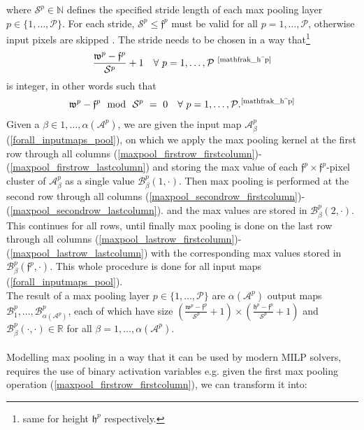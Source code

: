\documentclass{article}
\begin{document}
where $\mathcal{S}^p \in \mathbb{N}$ defines the specified stride length of each max pooling layer $p \in \{ 1, \ldots, \mathcal{P} \}$.  For each stride, $\mathcal{S}^p \leq \mathfrak{f}^p$ must be valid for all $p=1, \ldots, \mathcal{P}$, otherwise input pixels are skipped \cite{cs231:optimizers}. The stride needs to be chosen in a way that\footnote{same for height $\mathfrak{h}^p$ respectively.\label{mathfrak_h^p}}
\begin{align}
\frac{\mathfrak{w}^p- \mathfrak{f}^p}{\mathcal{S}^p} + 1 \quad \forall \ p=1, \ldots, \mathcal{P} \ \textsuperscript{\ref{mathfrak_h^p}}
\end{align} 
is integer, in other words such that
\begin{align}
\mathfrak{w}^p - \mathfrak{f}^p \mod  \ \mathcal{S}^p \ = \ 0 \quad \forall \ p=1, \ldots, \mathcal{P}.\textsuperscript{\ref{mathfrak_h^p}}
\end{align}
Given a $\beta \in 1, \ldots, \alpha(\mathcal{A}^p)$, we are given the input map $\mathcal{A}_\beta^p$ (\ref{forall_inputmaps_pool}), on which we apply the max pooling kernel at the first row through all columns (\ref{maxpool_firstrow_firstcolumn})-(\ref{maxpool_firstrow_lastcolumn}) and storing the max value of each $\mathfrak{f}^p \times \mathfrak{f}^p$-pixel cluster of  $\mathcal{A}^p_\beta$ as a single value $\mathcal{B}_\beta^p(1, \cdot)$. Then max pooling is performed at the second row through all  columns (\ref{maxpool_secondrow_firstcolumn})-(\ref{maxpool_secondrow_lastcolumn}).  and the max values are stored in $\mathcal{B}_\beta^p(2, \cdot)$. This continues for all rows, until finally max pooling is done on the last row through all columns (\ref{maxpool_lastrow_firstcolumn})-(\ref{maxpool_lastrow_lastcolumn})
with the corresponding max values stored in $\mathcal{B}_\beta^p(\mathfrak{f}^p, \cdot)$. This whole procedure is done for all input maps (\ref{forall_inputmaps_pool}).\\
The result of a max pooling layer $p \in \{1, \ldots, \mathcal{P} \}$ are $\alpha(\mathcal{A}^p)$ output maps $\mathcal{B}_1^p, \ldots, \mathcal{B}_{\alpha(\mathcal{A}^p)}^p$, each of which have size $\left( \frac{\mathfrak{w}^p - \mathfrak{f}^p}{\mathcal{S}^p}+1 \right) \times \left( \frac{\mathfrak{h}^p - \mathfrak{f}^p}{\mathcal{S}^p}+1 \right)$ and $\mathcal{B}^p_\beta(\cdot, \cdot) \in \mathbb{R}$ for all $\beta=1, \ldots, \alpha(\mathcal{A}^p)$.\\
\\
Modelling max pooling in a way that it can be used by modern MILP solvers, requires the use of binary activation variables e.g. given the first max pooling operation (\ref{maxpool_firstrow_firstcolumn}), we can transform it into:
\end{document}
